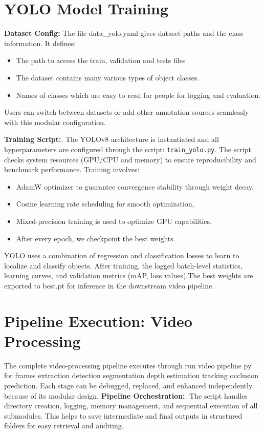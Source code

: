 \documentclass[12pt,a4paper]{report}
\theoremstyle{definition}
\theoremstyle{remark}
\begin{document}
\section{YOLO Model Training}
\textbf{Dataset Config:}  
The file data\_yolo.yaml gives dataset paths and the class information. It defines:
\begin{itemize}
\item The path to access the train, validation and tests files 
\item The dataset contains many various types of object classes. 
\item Names of classes which are easy to read for people for logging and evaluation.
\end{itemize}
Users can switch between datasets or add other annotation sources seamlessly with this modular configuration.

\noindent \textbf{Training Script:}.
The YOLOv8 architecture is instantiated and all hyperparameters are configured through the script: \texttt{train\_yolo.py}. The script checks system resources (GPU/CPU and memory) to ensure reproducibility and benchmark performance. Training involves:
\begin{itemize}
\item AdamW optimizer to guarantee convergence stability through weight decay.
\item Cosine learning rate scheduling for smooth optimization,
\item Mixed-precision training is used to optimize GPU capabilities.
\item After every epoch, we checkpoint the best weights. 
\end{itemize}
YOLO uses a combination of regression and classification losses to learn to localize and classify objects. After training, the logged batch-level statistics, learning curves, and validation metrics (mAP, loss values).The best weights are exported to best.pt for inference in the downstream video pipeline.

\section{Pipeline Execution: Video Processing}
The complete video-processing pipeline executes through run video pipeline py for frames extraction detection segmentation depth estimation tracking occlusion prediction.  Each stage can be debugged, replaced, and enhanced independently because of its modular design.
\noindent \textbf{Pipeline Orchestration:}.
The script handles directory creation, logging, memory management, and sequential execution of all submodules. This helps to save intermediate and final outputs in structured folders for easy retrieval and auditing.
\end{document}
